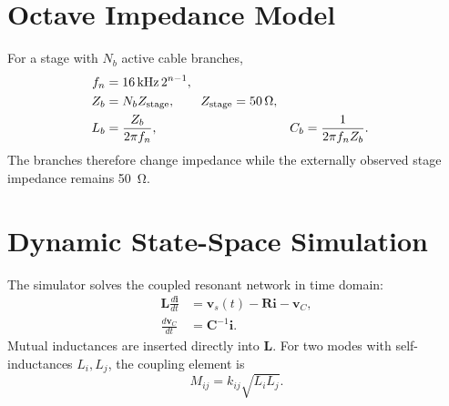 \documentclass[11pt]{article}
\begin{document}
\section{Octave Impedance Model}
For a stage with \(N_b\) active cable branches,
\begin{align}
f_n &= \SI{16}{kHz}\,2^{n-1},\\
Z_b &= N_b Z_{\rm stage},\qquad Z_{\rm stage}=\SI{50}{\ohm},\\
L_b &= \frac{Z_b}{2\pi f_n},&
C_b &= \frac{1}{2\pi f_n Z_b}.
\end{align}
The branches therefore change impedance while the externally observed stage
impedance remains \SI{50}{\ohm}.


\section{Dynamic State-Space Simulation}
The simulator solves the coupled resonant network in time domain:
\begin{align}
\mathbf{L}\frac{d\mathbf{i}}{dt} &=
\mathbf{v}_s(t)-\mathbf{R}\mathbf{i}-\mathbf{v}_C,\\
\frac{d\mathbf{v}_C}{dt} &= \mathbf{C}^{-1}\mathbf{i}.
\end{align}
Mutual inductances are inserted directly into \(\mathbf{L}\).  For two modes
with self-inductances \(L_i,L_j\), the coupling element is
\begin{equation}
M_{ij} = k_{ij}\sqrt{L_iL_j}.
\end{equation}
\end{document}
